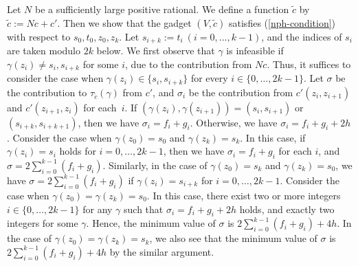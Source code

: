 \documentclass[11pt]{article}
\theoremstyle{definition}
\begin{document}
Let $N$ be a sufficiently large positive rational. We define a function $\tilde{c}$ by $\tilde{c}:=Nc+c'$. Then we show that the gadget $(V,\tilde{c})$ satisfies (\ref{nph-condition}) with respect to $s_0,t_0,z_0,z_k$. Let $s_{i+k}:=t_i\ (i=0,\ldots,k-1)$, and the indices of $s_i$ are taken modulo $2k$ below. We first observe that $\gamma$ is infeasible if $\gamma(z_i)\neq s_i,s_{i+k}$ for some $i$, due to the contribution from $Nc$. Thus, it suffices to consider the case when $\gamma(z_i)\in \{s_i,s_{i+k}\}$ for every $i\in \{0,\ldots,2k-1\}$. Let $\sigma$ be the contribution to $\tau_{\tilde{c}}(\gamma)$ from $c'$, and $\sigma_{i}$ be the contribution from $c'(z_i,z_{i+1})$ and $c'(z_{i+1},z_i)$ for each~$i$. If $(\gamma(z_i),\gamma(z_{i+1}))=(s_i,s_{i+1})$ or $(s_{i+k},s_{i+k+1})$, then we have $\sigma_i=f_i+g_i$. Otherwise, we have $\sigma_i=f_i+g_i+2h$. Consider the case when $\gamma(z_0)=s_0$ and $\gamma(z_k)=s_k$. In this case, if $\gamma(z_i)=s_i$ holds for $i=0,\ldots,2k-1$, then we have $\sigma_i=f_i+g_i$ for each $i$, and $\sigma=2\sum_{i=0}^{k-1}(f_i+g_i)$. Similarly, in the case of $\gamma(z_0)=s_k$ and $\gamma(z_k)=s_0$, we have $\sigma=2\sum_{i=0}^{k-1}(f_i+g_i)$ if $\gamma(z_i)=s_{i+k}$ for $i=0,\ldots,2k-1$. Consider the case when $\gamma(z_0)=\gamma(z_k)=s_0$. In this case, there exist two or more integers $i\in \{0,\ldots,2k-1\}$ for any $\gamma$ such that $\sigma_i=f_i+g_i+2h$ holds, and exactly two integers for some $\gamma$. Hence, the minimum value of $\sigma$ is $2\sum_{i=0}^{k-1}(f_i+g_i)+4h$. In the case of $\gamma(z_0)=\gamma(z_k)=s_k$, we also see that the minimum value of $\sigma$ is $2\sum_{i=0}^{k-1}(f_i+g_i)+4h$ by the similar argument.
\end{document}
